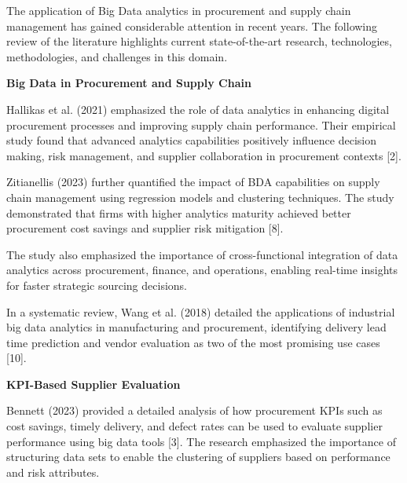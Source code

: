 \documentclass[10pt, onecolumn]{article}
\begin{document}
The application of Big Data analytics in procurement and supply chain management has gained considerable attention in recent years. The following review of the literature highlights current state-of-the-art research, technologies, methodologies, and challenges in this domain.

\vspace{\baselineskip}
\noindent\textbf{Big Data in Procurement and Supply Chain}
\vspace{\baselineskip}

Hallikas et al. (2021) emphasized the role of data analytics in enhancing digital procurement processes and improving supply chain performance. Their empirical study found that advanced analytics capabilities positively influence decision making, risk management, and supplier collaboration in procurement contexts [2].

\vspace{\baselineskip}

Zitianellis (2023) further quantified the impact of BDA capabilities on supply chain management using regression models and clustering techniques. The study demonstrated that firms with higher analytics maturity achieved better procurement cost savings and supplier risk mitigation [8].

\vspace{\baselineskip}

The study also emphasized the importance of cross-functional integration of data analytics across procurement, finance, and operations, enabling real-time insights for faster strategic sourcing decisions.
\vspace{\baselineskip}

In a systematic review, Wang et al. (2018) detailed the applications of industrial big data analytics in manufacturing and procurement, identifying delivery lead time prediction and vendor evaluation as two of the most promising use cases [10].

\vspace{\baselineskip}
\noindent\textbf{KPI-Based Supplier Evaluation}
\vspace{\baselineskip}

Bennett (2023) provided a detailed analysis of how procurement KPIs such as cost savings, timely delivery, and defect rates can be used to evaluate supplier performance using big data tools [3]. The research emphasized the importance of structuring data sets to enable the clustering of suppliers based on performance and risk attributes.
\end{document}
